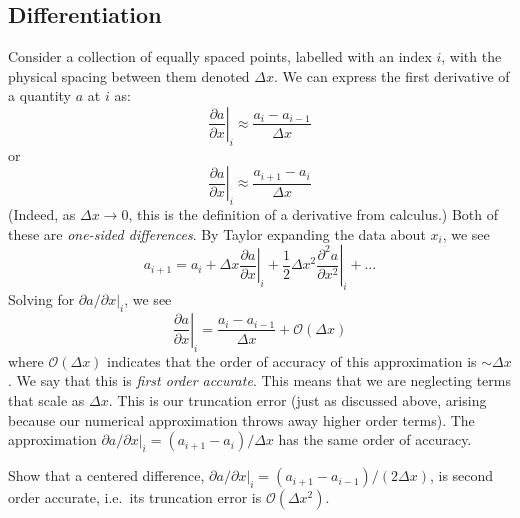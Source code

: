 \subsection{Differentiation}
\label{ch:intro:diff}
Consider a collection of equally spaced points, labelled with an index
$i$, with the physical spacing between them denoted $\Delta x$.  We
can express the first derivative of a quantity $a$ at 
$i$ as:
\begin{equation}
\left . \frac{\partial a}{\partial x} \right |_i \approx \frac{a_i - a_{i-1}}{\Delta x}
\end{equation}
or
\begin{equation}
\left . \frac{\partial a}{\partial x} \right |_i \approx \frac{a_{i+1} - a_i}{\Delta x}
\end{equation}
%
(Indeed, as $\Delta x \rightarrow 0$, this is the definition of a derivative from calculus.)
Both of these are {\em one-sided differences}.  By Taylor expanding the data
about $x_i$, we see
\begin{equation}
a_{i+1} = a_i + \Delta x \left . \frac{\partial a}{\partial x} \right |_i + \frac{1}{2} \Delta x^2 \left . \frac{\partial^2 a}{\partial x^2} \right |_i + \ldots
\end{equation}
Solving for ${\partial a}/{\partial x} |_i$, we see
\begin{equation}
\left . \frac{\partial a}{\partial x} \right |_i = \frac{a_i - a_{i-1}}{\Delta x} + \mathcal{O}(\Delta x)
\end{equation}
where $\mathcal{O}(\Delta x)$ indicates that the order of accuracy of
this approximation is $\sim \Delta x$.  We say that this is {\em first
  order accurate}.  This means that we are neglecting terms that scale
as $\Delta x$.  This is our truncation error (just as discussed above,
arising because our numerical approximation throws away higher order
terms).  The approximation ${\partial a}/{\partial x} |_i = ({a_{i+1}
  - a_i})/{\Delta x}$ has the same order of accuracy.

\begin{exercise}
{Show that a centered difference, ${\partial a}/
  {\partial x} |_i = ({a_{i+1} - a_{i-1}})/({2 \Delta x})$, is second order
accurate, i.e.\ its truncation error is $\mathcal{O}(\Delta x^2)$.}
\end{exercise}

